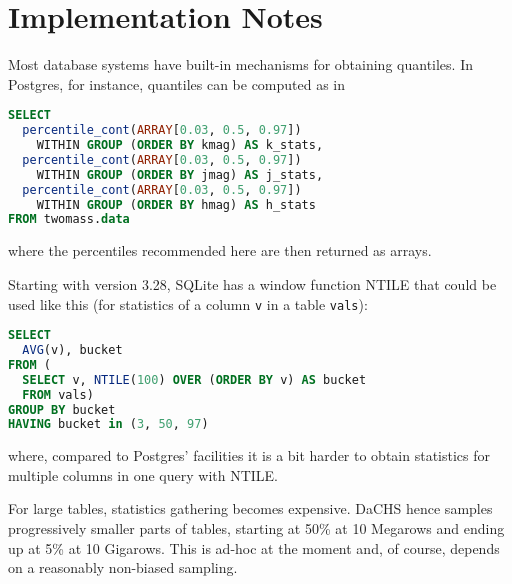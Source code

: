 \documentclass[11pt,a4paper]{ivoa}
\begin{document}
\section{Implementation Notes}

Most database systems have built-in mechanisms for obtaining
quantiles.  In Postgres, for instance, quantiles can be computed as in

\begin{lstlisting}[language=SQL]
SELECT 
  percentile_cont(ARRAY[0.03, 0.5, 0.97]) 
    WITHIN GROUP (ORDER BY kmag) AS k_stats,
  percentile_cont(ARRAY[0.03, 0.5, 0.97]) 
    WITHIN GROUP (ORDER BY jmag) AS j_stats,
  percentile_cont(ARRAY[0.03, 0.5, 0.97]) 
    WITHIN GROUP (ORDER BY hmag) AS h_stats
FROM twomass.data
\end{lstlisting}

where the percentiles recommended here are then returned as arrays.

Starting with version 3.28, SQLite has a window function NTILE that could be
used like this (for statistics of a column \verb|v| in a table
\verb|vals|):

\begin{lstlisting}[language=SQL]
SELECT 
  AVG(v), bucket 
FROM (
  SELECT v, NTILE(100) OVER (ORDER BY v) AS bucket 
  FROM vals) 
GROUP BY bucket 
HAVING bucket in (3, 50, 97)
\end{lstlisting}

where, compared to Postgres' facilities it is a bit harder to obtain
statistics for multiple columns in one query with NTILE.

For large tables, statistics gathering becomes expensive.  DaCHS hence
samples progressively smaller parts of tables, starting at 50\% at 10
Megarows and ending up at 5\% at 10 Gigarows.  This is ad-hoc at the
moment and, of course, depends on a reasonably non-biased sampling.


\end{document}
